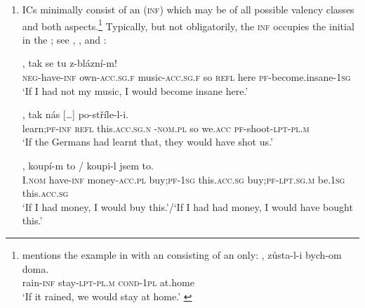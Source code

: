 \documentclass[output=paper,colorlinks,citecolor=brown,newtxmath]{langsci/langscibook}
\begin{document}
\begin{enumerate}

\item ICs minimally consist of an  (\textsc{inf}) which may be of all possible valency classes and both aspects.\footnote{\citet{Svoboda1959} mentions the example in  with an  consisting of an  only:
\ea\label{ex:rain}
, zůsta-l-i bych-om doma.\\
     {} rain-\textsc{inf} stay-\textsc{lpt-pl.m} \textsc{cond-1pl} {at.home}\\
\glt `If it rained, we would stay at home.' \hfill \citep[;][167]{Svoboda1959}
\z}
Typically, but not obligatorily, the \textsc{inf} occupies the initial  in the ; see , , and :

\ea\label{ex:music}
, tak se tu z-blázní-m!\\
     {} \textsc{neg}-have-\textsc{inf} own-\textsc{acc.sg.f} music-\textsc{acc.sg.f} so \textsc{refl} here \textsc{pf}-{become.insane}-\textsc{1sg}\\
\glt `If I had not my music, I would become insane here.' \\ \hfill \citep[;][4]{Milotova2012}
\z

\ea\label{ex:Germans}
, tak nás {[\ldots]}\hspace{-2pt} po-stříle-l-i.\\
     {} learn;\textsc{pf}-\textsc{inf} \textsc{refl} this.\textsc{acc.sg.n} -\textsc{nom.pl} so we.\textsc{acc} {} \textsc{pf}-shoot-\textsc{lpt-pl.m}\\
\glt `If the Germans had learnt that, they would have shot us.' \\ \hfill \citep[;][371]{Meyer2010}
\z

\ea\label{ex:money}
, koupí-m to / koupi-l jsem to.\\
     {} I.\textsc{nom} have-\textsc{inf} money-\textsc{acc.pl} buy;\textsc{pf}-\textsc{1sg} this.\textsc{acc.sg} {} buy;\textsc{pf}-\textsc{lpt.sg.m} be.\textsc{1sg} this.\textsc{acc.sg}\\
\glt `If I had money, I would buy this.'/`If I had had money, I would have bought this.' \hfill \citep[;][683]{Travnicek1951}
\z


\end{enumerate}
\end{document}
